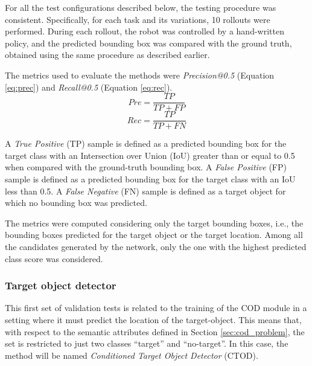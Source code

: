 For all the test configurations described below, the testing procedure was consistent. Specifically, for each task and its variations, 10 rollouts were performed. During each rollout, the robot was controlled by a hand-written policy, and the predicted bounding box was compared with the ground truth, obtained using the same procedure as described earlier.

The metrics used to evaluate the methods were \textit{Precision@0.5} (Equation \ref{eq:prec}) and \textit{Recall@0.5} (Equation \ref{eq:rec}).
\begin{equation}
    \label{eq:prec}
    Pre = \frac{TP}{TP+FP}
\end{equation} 
\begin{equation}
    \label{eq:rec}
    Rec = \frac{TP}{TP+FN}
\end{equation}

A \textit{True Positive} (TP) sample is defined as a predicted bounding box for the target class with an Intersection over Union (IoU) greater than or equal to 0.5 when compared with the ground-truth bounding box. A \textit{False Positive} (FP) sample is defined as a predicted bounding box for the target class with an IoU less than 0.5. A \textit{False Negative} (FN) sample is defined as a target object for which no bounding box was predicted.

The metrics were computed considering only the target bounding boxes, i.e., the bounding boxes predicted for the target object or the target location. Among all the candidates generated by the network, only the one with the highest predicted class score was considered.


\subsubsection{Target object detector}
This first set of validation tests is related to the training of the COD module in a setting where it must predict the location of the target-object. This means that, with respect to the semantic attributes defined in Section \ref{sec:cod_problem}, the set is restricted to just two classes ``target'' and ``no-target''. In this case, the method will be named \textit{Conditioned Target Object Detector} (CTOD).
\label{sec:cod_tod}
